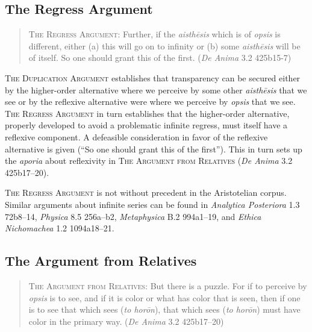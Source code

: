 \subsection{The Regress Argument} %
\label{sub:the_regress_argument}

\begin{quote}
	\textsc{The Regress Argument}: Further, if the \emph{aisthēsis} which is of \emph{opsis} is different, either (a) this will go on to infinity or (b) some \emph{aisthēsis} will be of itself. So one should grant this of the first. (\emph{De Anima} 3.2 425b15-7)
\end{quote}

\textsc{The Duplication Argument} establishes that transparency can be secured either by the higher-order alternative where we perceive by some other \emph{aisthēsis} that we see or by the reflexive alternative were where we perceive by \emph{opsis} that we see. \textsc{The Regress Argument} in turn establishes that the higher-order alternative, properly developed to avoid a problematic infinite regress, must itself have a reflexive component. A defeasible consideration in favor of the reflexive alternative is given (``So one should grant this of the first''). This in turn sets up the \emph{aporia} about reflexivity in \textsc{The Argument from Relatives} (\emph{De Anima} 3.2 425b17–20).

\textsc{The Regress Argument} is not without precedent in the Aristotelian corpus. Similar arguments about infinite series can be found in \emph{Analytica Posteriora} 1.3 72b8–14, \emph{Physica} 8.5 256a–b2, \emph{Metaphysica} B.2 994a1–19, and \emph{Ethica Nichomachea} 1.2 1094a18–21.


\subsection{The Argument from Relatives} %
\label{sub:the_argument_from_relatives}

\begin{quote}
	\textsc{The Argument from Relatives}: But there is a puzzle. For if to perceive by \emph{opsis} is to see, and if it is color or what has color that is seen, then if one is to see that which sees (\emph{to horōn}), that which sees (\emph{to horōn}) must have color in the primary way. (\emph{De Anima} 3.2 425b17–20)
\end{quote}

